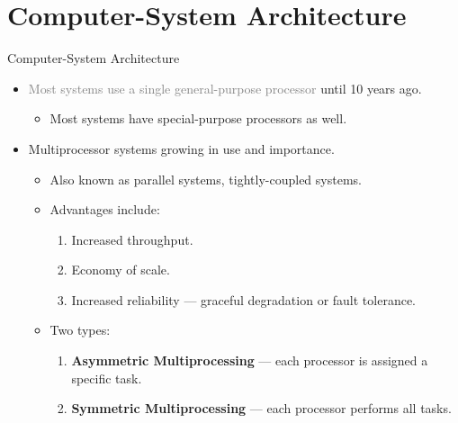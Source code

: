 \documentclass[10pt]{beamer}
\begin{document}
\section[3.Architecture]{Computer-System Architecture}
\begin{frame}{Computer-System Architecture}
\begin{itemize}
\item \textcolor{gray}{Most systems use a single general-purpose processor} until 10 years ago.
\begin{itemize}
\item Most systems have special-purpose processors as well.
\end{itemize}
\item \alert{Multiprocessor} systems growing in use and importance.
\begin{itemize}
\item Also known as \alert{parallel systems}, \alert{tightly-coupled systems}.
\item Advantages include:
\begin{enumerate}
\item Increased throughput.
\item Economy of scale.
\item Increased reliability --- graceful degradation or fault tolerance.
\end{enumerate}
\item Two types:
\begin{enumerate}
\item \textbf{\alert{Asymmetric Multiprocessing}} --- each processor is assigned a specific task.
\item \textbf{\alert{Symmetric Multiprocessing}} --- each processor performs all tasks.
\end{enumerate}
\end{itemize}
\end{itemize}
\end{frame}

\end{document}
